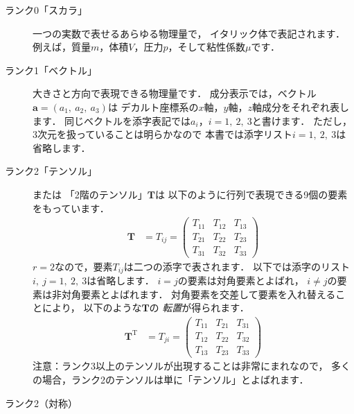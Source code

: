 \begin{description}
 \item[ランク0「スカラ」] 一つの実数で表せるあらゆる物理量で，
            イタリック体で表記されます．
            例えば，質量$m$，体積$V$，圧力$p$，そして粘性係数$\mu$です．
 \item[ランク1「ベクトル」] 大きさと方向で表現できる物理量です．
            成分表示では，ベクトル$\bm{a} = (a_{1},\ a_{2},\ a_{3})$は
            デカルト座標系の$x$軸，$y$軸，$z$軸成分をそれぞれ表します．
            同じベクトルを添字表記では$a_{i}$，$i = 1,\ 2,\ 3$と書けます．
            ただし，3次元を扱っていることは明らかなので
            本書では添字リスト$i = 1,\ 2,\ 3$は省略します．
 \item[ランク2「テンソル」] または
%
「2階のテンソル」$\bm{T}$は
            以下のように行列で表現できる9\nobreak 個の要素をもっています．
            \begin{align}
             \label{eq:1.1}
             \bm{T} &= T_{ij}
             = \begin{pmatrix}
                T_{11} & T_{12} & T_{13} \\
                T_{21} & T_{22} & T_{23} \\
                T_{31} & T_{32} & T_{33}
               \end{pmatrix}
            \end{align}
            $r = 2$なので，要素$T_{ij}$は二つの添字で表されます．
            以下では添字のリスト$i,\ j = 1,\ 2,\ 3$は省略します．
            $i = j$の要素は対角要素とよばれ，
            $i \ne j$の要素は非対角要素とよばれます．
            対角要素を交差して要素を入れ替えることにより，
            以下のような$\bm{T}$の
%
            \emph{転置}が得られます．
            \begin{align}
             \label{eq:1.2}
             \bm{T}^{\mathrm{T}} &= T_{ji}
             = \begin{pmatrix}
                T_{11} & T_{21} & T_{31} \\
                T_{12} & T_{22} & T_{32} \\
                T_{13} & T_{23} & T_{33}
               \end{pmatrix}
            \end{align}
            注意：ランク3以上のテンソルが出現することは非常にまれなので，
            多くの場合，ランク2のテンソルは単に「テンソル」とよばれます．
 \item[ランク2（対称）]

\end{description}
